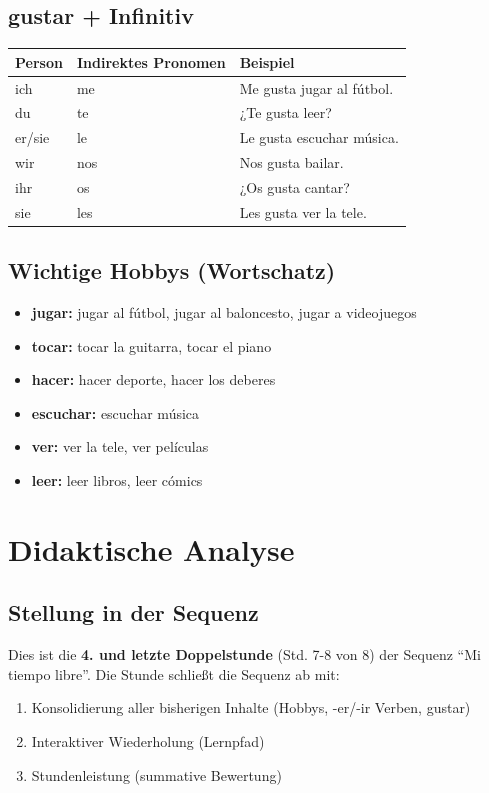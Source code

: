 \documentclass[11pt,a4paper]{article}
\newcommand{\reihenthema}{Mi tiempo libre}
\begin{document}
\subsection{gustar + Infinitiv}
\begin{center}
\begin{tabular}{|l|l|l|}
\hline
\textbf{Person} & \textbf{Indirektes Pronomen} & \textbf{Beispiel} \\
\hline
ich & me & Me gusta jugar al fútbol. \\
du & te & ¿Te gusta leer? \\
er/sie & le & Le gusta escuchar música. \\
wir & nos & Nos gusta bailar. \\
ihr & os & ¿Os gusta cantar? \\
sie & les & Les gusta ver la tele. \\
\hline
\end{tabular}
\end{center}

\subsection{Wichtige Hobbys (Wortschatz)}
\begin{itemize}
    \item \textbf{jugar:} jugar al fútbol, jugar al baloncesto, jugar a videojuegos
    \item \textbf{tocar:} tocar la guitarra, tocar el piano
    \item \textbf{hacer:} hacer deporte, hacer los deberes
    \item \textbf{escuchar:} escuchar música
    \item \textbf{ver:} ver la tele, ver películas
    \item \textbf{leer:} leer libros, leer cómics
\end{itemize}

\section{Didaktische Analyse}

\subsection{Stellung in der Sequenz}
Dies ist die \textbf{4. und letzte Doppelstunde} (Std. 7-8 von 8) der Sequenz ``\reihenthema''.
Die Stunde schließt die Sequenz ab mit:
\begin{enumerate}
    \item Konsolidierung aller bisherigen Inhalte (Hobbys, -er/-ir Verben, gustar)
    \item Interaktiver Wiederholung (Lernpfad)
    \item Stundenleistung (summative Bewertung)
\end{enumerate}
\end{document}
